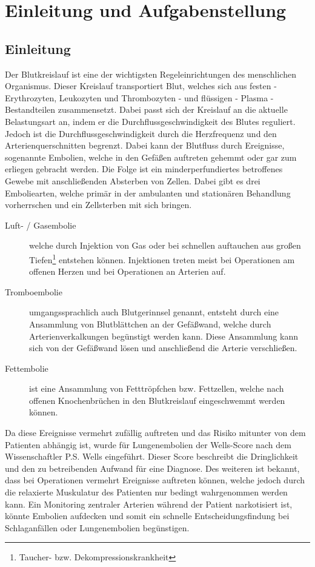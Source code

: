 \chapter{Einleitung und Aufgabenstellung}


\section{Einleitung}
Der Blutkreislauf ist eine der wichtigsten Regeleinrichtungen des menschlichen Organismus. Dieser Kreislauf transportiert Blut, welches sich aus festen - Erythrozyten, Leukozyten und Thrombozyten - und flüssigen - Plasma - Bestandteilen zusammensetzt. Dabei passt sich der Kreislauf an die aktuelle Belastungsart an, indem er die Durchflussgeschwindigkeit des Blutes reguliert. Jedoch ist die Durchflussgeschwindigkeit durch die Herzfrequenz und den Arterienquerschnitten begrenzt.
Dabei kann der Blutfluss durch Ereignisse, sogenannte Embolien, welche in den Gefäßen auftreten gehemmt oder gar zum erliegen gebracht werden. Die Folge ist ein minderperfundiertes betroffenes Gewebe mit anschließenden Absterben von Zellen. Dabei gibt es drei Emboliearten, welche primär in der ambulanten und stationären Behandlung vorherrschen und ein Zellsterben mit sich bringen.
\begin{description}
\item[Luft- / Gasembolie] welche durch Injektion von Gas oder bei schnellen auftauchen aus großen Tiefen\footnote{Taucher- bzw. Dekompressionskrankheit} entstehen können. Injektionen treten meist bei Operationen am offenen Herzen und bei Operationen an Arterien auf.
\item[Tromboembolie] umgangssprachlich auch \glqq Blutgerinnsel\grqq{} genannt, entsteht durch eine Ansammlung von Blutblättchen an der Gefäßwand, welche durch Arterienverkalkungen begünstigt werden kann. Diese Ansammlung kann sich von der Gefäßwand lösen und anschließend die Arterie verschließen.
\item[Fettembolie] ist eine Ansammlung von Fetttröpfchen bzw. Fettzellen, welche nach offenen Knochenbrüchen in den Blutkreislauf eingeschwemmt werden können.
\end{description}
Da diese Ereignisse vermehrt zufällig auftreten und das Risiko mitunter von dem Patienten abhängig ist, wurde für Lungenembolien der Wells-Score nach dem Wissenschaftler P.S. Wells eingeführt. Dieser Score beschreibt die Dringlichkeit und den zu betreibenden Aufwand für eine Diagnose. Des weiteren ist bekannt, dass bei Operationen vermehrt Ereignisse auftreten können, welche jedoch durch die relaxierte Muskulatur des Patienten nur bedingt wahrgenommen werden kann. Ein Monitoring zentraler Arterien während der Patient narkotisiert ist, könnte Embolien aufdecken und somit ein schnelle Entscheidungsfindung bei Schlaganfällen oder Lungenembolien begünstigen.\\
